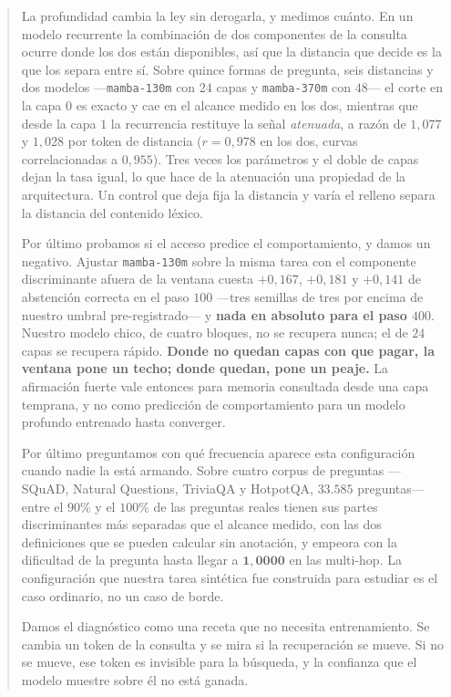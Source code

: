 \documentclass[11pt,a4paper]{article}
\begin{document}
\begin{abstract}
La profundidad cambia la ley sin derogarla, y medimos cuánto. En un modelo recurrente la combinación
de dos componentes de la consulta ocurre donde los dos están disponibles, así que la distancia que
decide es la que los separa entre sí. Sobre quince formas de pregunta, seis distancias y dos modelos
---\texttt{mamba-130m} con $24$ capas y \texttt{mamba-370m} con $48$--- el corte en la capa $0$ es
exacto y cae en el alcance medido en los dos, mientras que desde la capa $1$ la recurrencia restituye
la señal \emph{atenuada}, a razón de $1{,}077$ y $1{,}028$ por token de distancia ($r = 0{,}978$ en
los dos, curvas correlacionadas a $0{,}955$). Tres veces los parámetros y el doble de capas dejan la
tasa igual, lo que hace de la atenuación una propiedad de la arquitectura. Un control que deja fija la
distancia y varía el relleno separa la distancia del contenido léxico.

Por último probamos si el acceso predice el comportamiento, y damos un negativo. Ajustar
\texttt{mamba-130m} sobre la misma tarea con el componente discriminante afuera de la ventana cuesta
$+0{,}167$, $+0{,}181$ y $+0{,}141$ de abstención correcta en el paso $100$ ---tres semillas de tres
por encima de nuestro umbral pre-registrado--- y \textbf{nada en absoluto para el paso $400$}.
Nuestro modelo chico, de cuatro bloques, no se recupera nunca; el de $24$ capas se recupera rápido.
\textbf{Donde no quedan capas con que pagar, la ventana pone un techo; donde quedan, pone un peaje.}
La afirmación fuerte vale entonces para memoria consultada desde una capa temprana, y no como
predicción de comportamiento para un modelo profundo entrenado hasta converger.

Por último preguntamos con qué frecuencia aparece esta configuración cuando nadie la está
armando. Sobre cuatro corpus de preguntas ---SQuAD, Natural Questions, TriviaQA y HotpotQA, $33{.}585$
preguntas--- entre el $90\%$ y el $100\%$ de las preguntas reales tienen sus partes discriminantes más
separadas que el alcance medido, con las dos definiciones que se pueden calcular sin anotación, y
empeora con la dificultad de la pregunta hasta llegar a $\mathbf{1{,}0000}$ en las multi-hop. La configuración que nuestra tarea sintética fue construida para
estudiar es el caso ordinario, no un caso de borde.

Damos el diagnóstico como una receta que no necesita entrenamiento. Se cambia un token de la consulta
y se mira si la recuperación se mueve. Si no se mueve, ese token es invisible para la búsqueda, y la
confianza que el modelo muestre sobre él no está ganada.
\end{abstract}
\end{document}
